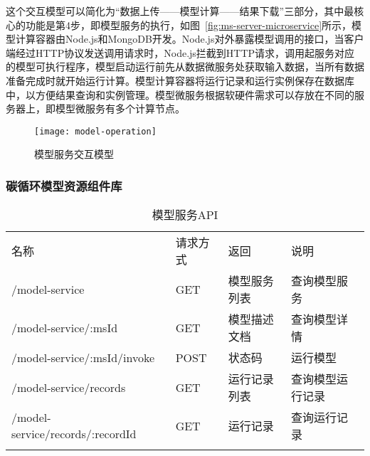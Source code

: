 这个交互模型可以简化为“数据上传——模型计算——结果下载”三部分，其中最核心的功能是第4步，即模型服务的执行，如图~\ref{fig:ms-server-microservice}所示，模型计算容器由Node.js和MongoDB开发。Node.js对外暴露模型调用的接口，当客户端经过HTTP协议发送调用请求时，Node.js拦截到HTTP请求，调用起服务对应的模型可执行程序，模型启动运行前先从数据微服务处获取输入数据，当所有数据准备完成时就开始运行计算。模型计算容器将运行记录和运行实例保存在数据库中，以方便结果查询和实例管理。模型微服务根据软硬件需求可以存放在不同的服务器上，即模型微服务有多个计算节点。

\begin{figure}[!htbp]
    \centering
    \texttt{[image: model-operation]}
    \caption{模型服务交互模型}
    \label{fig:model-operation}
\end{figure}

\subsubsection{碳循环模型资源组件库}

\begin{table}[!htbp]
    \centering
    \caption{模型服务API}
    \label{tab:model-service-API}
    \begin{tabular}{llll}
        \Xhline{1.5pt}
        名称 & 请求方式 & 返回 & 说明 \\
        \Xhline{1.5pt}
        /model-service & GET & 模型服务列表 & 查询模型服务 \\
        /model-service/:msId & GET & 模型描述文档 & 查询模型详情 \\
        /model-service/:msId/invoke & POST & 状态码 & 运行模型 \\ 
        /model-service/records & GET & 运行记录列表 & 查询模型运行记录 \\
        /model-service/records/:recordId & GET & 运行记录 & 查询运行记录 \\
        \Xhline{1.5pt}
    \end{tabular}
\end{table}


